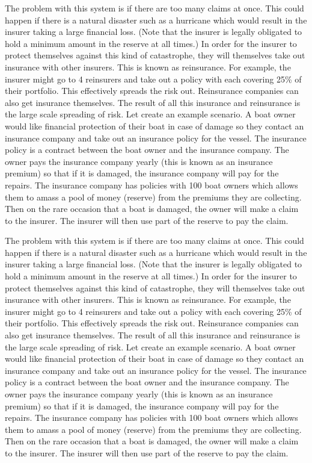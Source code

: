 \documentclass[12pt]{article}
\begin{document}
The problem with this system is if there are too many claims at once. This could happen if there is a natural disaster such as a hurricane which would result in the insurer taking a large financial loss. (Note that the insurer is legally obligated to hold a minimum amount in the reserve at all times.) In order for the insurer to protect themselves against this kind of catastrophe, they will themselves take out insurance with other insurers. This is known as reinsurance. For example, the insurer might go to 4 reinsurers and take out a policy with each covering 25\% of their portfolio. This effectively spreads the risk out. Reinsurance companies can also get insurance themselves. The result of all this insurance and reinsurance is the large scale spreading of risk.
Let create an example scenario. A boat owner would like financial protection of their boat in case of damage so they contact an insurance company and take out an insurance policy for the vessel. The insurance policy is a contract between the boat owner and the insurance company. The owner pays the insurance company yearly (this is known as an insurance premium) so that if it is damaged, the insurance company will pay for the repairs. The insurance company has policies with 100 boat owners which allows them to amass a pool of money (reserve) from the premiums they are collecting. Then on the rare occasion that a boat is damaged, the owner will make a claim to the insurer. The insurer will then use part of the reserve to pay the claim.

The problem with this system is if there are too many claims at once. This could happen if there is a natural disaster such as a hurricane which would result in the insurer taking a large financial loss. (Note that the insurer is legally obligated to hold a minimum amount in the reserve at all times.) In order for the insurer to protect themselves against this kind of catastrophe, they will themselves take out insurance with other insurers. This is known as reinsurance. For example, the insurer might go to 4 reinsurers and take out a policy with each covering 25\% of their portfolio. This effectively spreads the risk out. Reinsurance companies can also get insurance themselves. The result of all this insurance and reinsurance is the large scale spreading of risk.
Let create an example scenario. A boat owner would like financial protection of their boat in case of damage so they contact an insurance company and take out an insurance policy for the vessel. The insurance policy is a contract between the boat owner and the insurance company. The owner pays the insurance company yearly (this is known as an insurance premium) so that if it is damaged, the insurance company will pay for the repairs. The insurance company has policies with 100 boat owners which allows them to amass a pool of money (reserve) from the premiums they are collecting. Then on the rare occasion that a boat is damaged, the owner will make a claim to the insurer. The insurer will then use part of the reserve to pay the claim.
\end{document}
